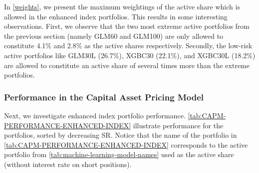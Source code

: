In \autoref{weights}, we present the maximum weightings of the active share which is allowed in the enhanced index portfolios. This results in some interesting observations. First, we observe that the two most extreme active portfolios from the previous section (namely GLM60 and GLM100) are only allowed to constitute 4.1\% and 2.8\% as the active shares respectively. Secondly, the low-risk active portfolios like GLM30L (26.7\%), XGBC30 (22.1\%), and XGBC30L (18.2\%) are allowed to constitute an active share of several times more than the extreme portfolios.

\subsubsection{Performance in the Capital Asset Pricing Model}

Next, we investigate enhanced index portfolio performance. \autoref{tab:CAPM-PERFORMANCE-ENHANCED-INDEX} illustrate performance for the portfolios, sorted by decreasing SR. Notice that the name of the portfolio in \autoref{tab:CAPM-PERFORMANCE-ENHANCED-INDEX} corresponds to the active portfolio from \autoref{tab:machine-learning-model-names} used as the active share (without interest rate on short positions). 


